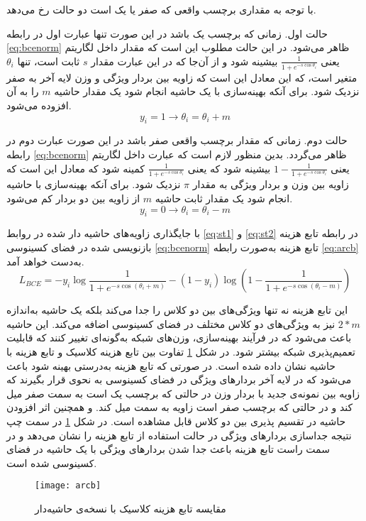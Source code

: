 با توجه به مقداری برچسب واقعی  که صفر یا یک است دو حالت رخ می‌دهد.

حالت اول. زمانی که برچسب یک باشد در این صورت تنها عبارت اول در رابطه 
\ref{eq:bcenorm}
 ظاهر می‌شود. در این حالت مطلوب این است که مقدار داخل لگاریتم یعنی 
 $\frac{1}{1+e^{-s\cos{\theta_i}}}$
 بیشینه شود و از آن‌جا که در این عبارت مقدار  
$s$
ثابت است، تنها 
$\theta_i$
متغیر است، که این معادل این است که زاویه بین بردار ویژگی و وزن لایه آخر به صفر نزدیک شود. برای آنکه بهینه‌سازی با یک حاشیه انجام شود یک مقدار حاشیه $m$ را به آن افزوده می‌شود.
  \begin{equation}\label{eq:st1}
 	y_i=1 \to \theta_i= \theta_i + m
 \end{equation}

حالت دوم. زمانی که مقدار برچسب واقعی صفر باشد در این صورت عبارت دوم در رابطه 
\ref{eq:bcenorm}
 ظاهر می‌گردد. بدین منظور لازم است که عبارت داخل لگاریتم یعنی
 $1-\frac{1}{1+e^{-s\cos{\theta_i}}}$
 بیشینه شود که یعنی  
  $\frac{1}{1+e^{-s\cos{\theta_i}}}$
 کمینه شود که معادل این است که زاویه بین وزن و بردار ویژگی به مقدار 
$\pi$
  نزدیک شود. برای آنکه بهینه‌سازی با حاشیه انجام شود یک مقدار ثابت حاشیه $m$ از زاویه بین دو بردار کم می‌شود.
   \begin{equation}\label{eq:st2}
 	y_i=0 \to \theta_i= \theta_i - m
 \end{equation}

با جایگذاری زاویه‌های حاشیه دار شده در روابط 
\ref{eq:st1}
 و 
 \ref{eq:st2}
 در رابطه تابع هزینه  بازنویسی شده در فضای کسینوسی 
 \ref{eq:bcenorm}
 تابع هزینه  به‌صورت رابطه
\ref{eq:arcb}
  به‌دست خواهد آمد.
\begin{equation}\label{eq:arcb}
	L_{BCE} = -y_i \log{\frac{1}{1+e^{-s\cos{(\theta_i+m)}}}} - (1-y_i)\log{(1-\frac{1}{1+e^{-s\cos{(\theta_i-m)}}} )}
\end{equation}

این تابع هزینه نه تنها ویژگی‌های بین دو کلاس را جدا می‌کند بلکه یک حاشیه به‌اندازه  
$2*m$
نیز به ویژگی‌های دو کلاس مختلف در فضای کسینوسی اضافه می‌کند. این حاشیه باعث می‌شود که در فرآیند بهینه‌سازی، وزن‌های شبکه به‌گونه‌ای تغییر کنند که قابلیت تعمیم‌پذیری شبکه بیشتر شود.
در شکل
\ref{fig:arcb}
تفاوت بین تابع هزینه کلاسیک و تابع هزینه با حاشیه نشان داده شده است. در صورتی که تابع هزینه به‌درستی بهینه شود باعث می‌شود که در لایه آخر بردارهای ویژگی در فضای کسینوسی به نحوی قرار بگیرند که زاویه بین نمونه‌ی جدید با بردار وزن در حالتی که برچسب یک است به سمت صفر میل کند و در حالتی که برچسب صفر است زاویه به سمت  میل کند. و همچنین اثر افزودن حاشیه در تقسیم پذیری بین دو کلاس قابل مشاهده است. در شکل
\ref{fig:arcb}
در سمت چپ نتیجه جداسازی بردارهای ویژگی در حالت استفاده از تابع هزینه  را نشان می‌دهد و در سمت راست تابع هزینه  باعث جدا شدن بردارهای ویژگی با یک حاشیه در فضای کسینوسی شده است. 
\begin{figure}[h]
	\centerline{\texttt{[image: arcb]}}
	\caption{مقایسه تابع هزینه
		کلاسیک با نسخه‌ی حاشیه‌دار
	 }
	\label{fig:arcb}
\end{figure}

